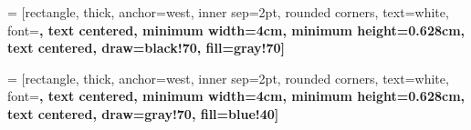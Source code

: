 
\usetikzlibrary{trees,calc}

	

     = [rectangle, 
                      thick,
                      anchor=west,
                      inner sep=2pt,
                      rounded corners, 
                      text=white, 
                      font=\bfseries,
                      text centered, 
                      minimum width=4cm, 
                      minimum height=0.628cm, 
                      text centered, 
                      draw=black!70, 
                      fill=gray!70]

      = [rectangle, 
                       thick,
                       anchor=west,
                       inner sep=2pt,
                       rounded corners, 
                       text=white, 
                       font=\bfseries,
                       text centered,  
                       minimum width=4cm, 
                       minimum height=0.628cm, 
                       text centered, 
                       draw=gray!70, 
                       fill=blue!40]
                       



